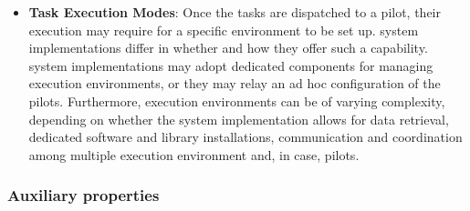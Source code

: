 \documentclass{sig-alternate}
\begin{document}
\begin{itemize}
\item \textbf{Task Execution Modes}: Once the tasks are dispatched to
  a pilot, their execution may require for a specific environment to
  be set up.  \pilot system implementations differ in whether and how they
  offer such a capability. \pilot system implementations may adopt
  dedicated components for managing execution environments, or they
  may relay an ad hoc configuration of the pilots. Furthermore,
  execution environments can be of varying complexity, depending on
  whether the \pilot system implementation allows for data retrieval,
  dedicated software and library installations, communication and
  coordination among multiple execution environment and, in case,
  pilots.



\end{itemize}


\subsubsection{Auxiliary properties}
\end{document}
